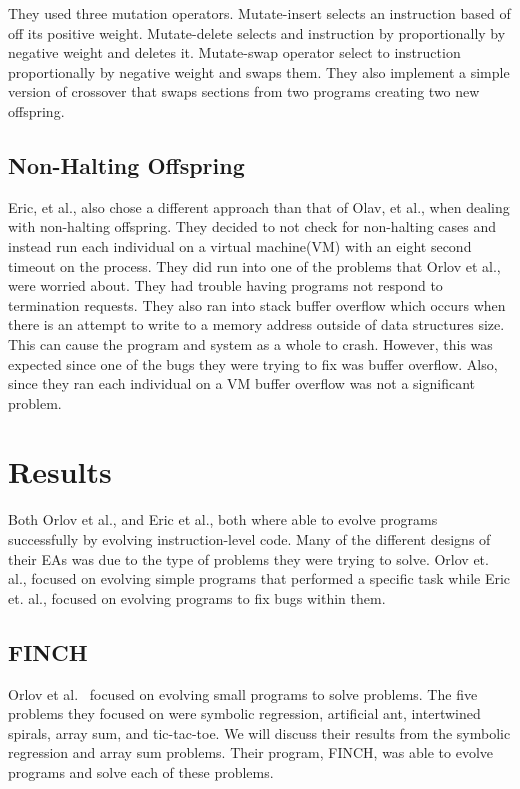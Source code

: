 \documentclass{sig-alternate}
\begin{document}
They used three mutation operators. Mutate-insert selects an instruction based of off its positive weight. Mutate-delete selects and instruction by proportionally by negative weight and deletes it. Mutate-swap operator select to instruction proportionally by negative weight and swaps them. They also implement a simple version of crossover that swaps sections from two programs creating two new offspring.

\subsection{Non-Halting Offspring}

Eric, et al., also chose a different approach than that of Olav, et al., when dealing with non-halting offspring. They decided to not check for non-halting cases and instead run each individual on a virtual machine(VM) with an eight second timeout on the process. They did run into one of the problems that Orlov et al., were worried about. They had trouble having programs not respond to termination requests.
They also ran into stack buffer overflow which occurs when there is an attempt to write to a memory address outside of data structures size. This can cause the program and system as a whole to crash. However, this was expected since one of the bugs they were trying to fix was buffer overflow. Also, since they ran each individual on a VM buffer overflow was not a significant problem.




\section{Results}
Both Orlov et al., and Eric et al., both where able to evolve programs successfully by evolving instruction-level code. Many of the different designs of their EAs was due to the type of problems they were trying to solve. Orlov et. al., focused on evolving simple programs that performed a specific task while Eric et. al., focused on evolving programs to fix bugs within them.

\subsection{FINCH}
Orlov et al.~\cite{FINCH:2011} focused on evolving small programs to solve problems. The five problems they focused on were symbolic regression, artificial ant, intertwined spirals, array sum, and tic-tac-toe. We will discuss their results from the symbolic regression and array sum problems. Their program, FINCH, was able to evolve programs and solve each of these problems.
\end{document}
